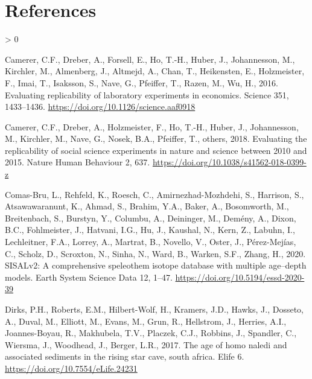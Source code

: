 \documentclass[]{elsarticle} %
\newlength{\cslhangindent}
\newenvironment{CSLReferences}[2] %
 {%
  \setlength{\parindent}{0pt}
  \ifodd #1 \everypar{\setlength{\hangindent}{\cslhangindent}}\ignorespaces\fi
  \ifnum #2 > 0
  \setlength{\parskip}{#2\baselineskip}
  \fi
 }%
 {}
\begin{document}
\newpage

\nolinenumbers

\hypertarget{references}{%
\section*{References}\label{references}}

\hypertarget{refs}{}
\begin{CSLReferences}{1}{0}
\leavevmode\hypertarget{ref-Camerer1433}{}%
Camerer, C.F., Dreber, A., Forsell, E., Ho, T.-H., Huber, J., Johannesson, M., Kirchler, M., Almenberg, J., Altmejd, A., Chan, T., Heikensten, E., Holzmeister, F., Imai, T., Isaksson, S., Nave, G., Pfeiffer, T., Razen, M., Wu, H., 2016. Evaluating replicability of laboratory experiments in economics. Science 351, 1433--1436. \url{https://doi.org/10.1126/science.aaf0918}

\leavevmode\hypertarget{ref-camerer2018evaluating}{}%
Camerer, C.F., Dreber, A., Holzmeister, F., Ho, T.-H., Huber, J., Johannesson, M., Kirchler, M., Nave, G., Nosek, B.A., Pfeiffer, T., others, 2018. Evaluating the replicability of social science experiments in nature and science between 2010 and 2015. Nature Human Behaviour 2, 637. \url{https://doi.org/10.1038/s41562-018-0399-z}

\leavevmode\hypertarget{ref-ComasBru2020SISALv2AC}{}%
Comas-Bru, L., Rehfeld, K., Roesch, C., Amirnezhad-Mozhdehi, S., Harrison, S., Atsawawaranunt, K., Ahmad, S., Brahim, Y.A., Baker, A., Bosomworth, M., Breitenbach, S., Burstyn, Y., Columbu, A., Deininger, M., Demény, A., Dixon, B.C., Fohlmeister, J., Hatvani, I.G., Hu, J., Kaushal, N., Kern, Z., Labuhn, I., Lechleitner, F.A., Lorrey, A., Martrat, B., Novello, V., Oster, J., Pérez-Mejías, C., Scholz, D., Scroxton, N., Sinha, N., Ward, B., Warken, S.F., Zhang, H., 2020. SISALv2: A comprehensive speleothem isotope database with multiple age--depth models. Earth System Science Data 12, 1--47. \url{https://doi.org/10.5194/essd-2020-39}

\leavevmode\hypertarget{ref-Dirks2017}{}%
Dirks, P.H., Roberts, E.M., Hilbert-Wolf, H., Kramers, J.D., Hawks, J., Dosseto, A., Duval, M., Elliott, M., Evans, M., Grun, R., Hellstrom, J., Herries, A.I., Joannes-Boyau, R., Makhubela, T.V., Placzek, C.J., Robbins, J., Spandler, C., Wiersma, J., Woodhead, J., Berger, L.R., 2017. The age of homo naledi and associated sediments in the rising star cave, south africa. Elife 6. \url{https://doi.org/10.7554/eLife.24231}


\end{CSLReferences}
\end{document}
